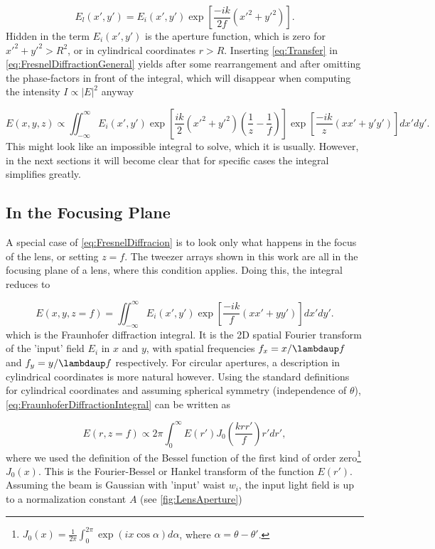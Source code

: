 \begin{equation}\label{eq:Transfer}
	E_l(x',y')= E_i(x',y') \exp{
		\left[\frac{-i k}{2 f}(x'^2+y'^2)\right].
	}
\end{equation}
Hidden in the term $E_i(x',y')$ is the aperture function, which is zero for $x'^2+y'^2>R^2$, or in cylindrical coordinates $r>R$.
Inserting \cref{eq:Transfer} in \cref{eq:FresnelDiffractionGeneral} yields after some rearrangement and after omitting the phase-factors in front of the integral, which will disappear when computing the intensity $I \propto |E|^2$ anyway \cite{Gu2000}

\begin{equation}\label{eq:FresnelDiffracion}
	E(x,y,z) \propto 
	\iint_{-\infty}^{\infty} E_i(x',y')
	\exp{\left[
		\frac{ik}{2}(x'^2+y'^2)\left(\frac{1}{z}-\frac{1}{f}\right)
	\right]}
	\exp{\left[\frac{-ik}{z}\left(xx'+y'y'\right)\right]} dx'dy'.
\end{equation}
This might look like an impossible integral to solve, which it is usually.
However, in the next sections it will become clear that for specific cases the integral simplifies greatly.  

\subsection{In the Focusing Plane}\label{sec:InFocus}

A special case of \cref{eq:FresnelDiffracion} is to look only what happens in the focus of the lens, or setting $z=f$.
The tweezer arrays shown in this work are all in the focusing plane of a lens, where this condition applies.
Doing this, the integral reduces to 

\begin{equation}\label{eq:FraunhoferDiffractionIntegral}
    E(x, y, z=f)=\iint_{-\infty}^{\infty} E_i(x', y') \exp \left[\frac{-ik}{f}(x x'+y y')\right] dx' dy'.
\end{equation}
which is the Fraunhofer diffraction integral. 
It is the 2D spatial Fourier transform of the 'input' field $E_i$ in $x$ and $y$, with spatial frequencies $f_x = x/\lambdaup f$ and $f_y = y/\lambdaup f$ respectively.
For circular apertures, a description in cylindrical coordinates is more natural however. 
Using the standard definitions for cylindrical coordinates and assuming spherical symmetry (independence of $\theta$), \cref{eq:FraunhoferDiffractionIntegral} can be written as 

\begin{equation}\label{eq:FourierBessel}
	E(r,z=f) \propto 2\pi \int_0^{\infty} E(r') J_0\left( \frac{k r r'}{f}\right) r'dr',
\end{equation}
where we used the definition of the  Bessel function of the first kind of order zero\footnote{$J_0(x) = \frac{1}{2\pi} \int_0^{2\pi} \exp{(i x \cos{\alpha})} d\alpha$, where  $\alpha=\theta-\theta'$.} $J_0(x)$. 
This is the Fourier-Bessel or Hankel transform of the function $E(r')$.
Assuming the beam is Gaussian with 'input' waist $w_i$, the input light field is up to a normalization constant $A$ (see \cref{fig:LensAperture})


